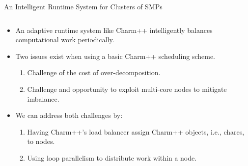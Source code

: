 \begin{frame}{An Intelligent Runtime System for Clusters of SMPs}{}
\begin{columns}
\begin{column}{0.5\columnwidth}
  \begin{itemize}
 \small \item \small An adaptive runtime system like Charm++ intelligently balances computational work periodically.
  \item \small Two issues exist when using a basic Charm++ scheduling scheme.
    \begin{enumerate}
    \small \item \small Challenge of the cost of over-decomposition.
    \item \small Challenge and opportunity to exploit multi-core nodes to mitigate imbalance.
    \end{enumerate}
    \item We can address both challenges by:
    \begin{enumerate}
    \small \item \small Having Charm++'s load balancer assign Charm++ objects, i.e., chares, to nodes.%
    \item \small Using loop parallelism to distribute work within a node.
    \end{enumerate}
  \end{itemize} 
\end{column}


\end{columns}
\end{frame}
